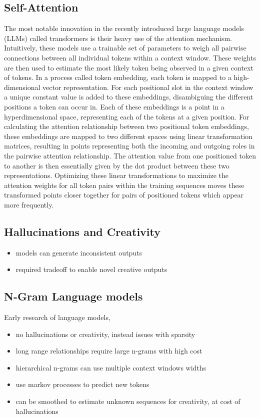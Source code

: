 \documentclass[10pt]{report}
\begin{document}
\subsection{Self-Attention}
The most notable innovation in the recently introduced large language models (LLMs) called transformers is their heavy use of the attention mechanism. Intuitively, these models use a trainable set of parameters to weigh all pairwise connections between all individual tokens within a context window. These weights are then used to estimate the most likely token being observed in a given context of tokens.
In a process called token embedding, each token is mapped to a high-dimensional vector representation. For each positional slot in the context window a unique constant value is added to these embeddings, disambiguing the different positions a token can occur in.
Each of these embeddings is a point in a hyperdimensional space, representing each of the tokens at a given position.
For calculating the attention relationship between two positional token embeddings, these embeddings are mapped to two different spaces using linear transformation matrices, resulting in points representing both the incoming and outgoing roles in the pairwise attention relationship. The attention value from one positioned token to another is then essentially given by the dot product between these two representations.
Optimizing these linear transformations to maximize the attention weights for all token pairs within the training sequences moves these transformed points closer together for pairs of positioned tokens which appear more frequently.

\subsection{Hallucinations and Creativity}
\begin{itemize}
    \item models can generate inconsistent outputs
    \item required tradeoff to enable novel creative outputs
\end{itemize}

\subsection{N-Gram Language models}
Early research of language models, 
\begin{itemize}
    \item no hallucinations or creativity, instead issues with sparsity
    \item long range relationships require large n-grams with high cost
    \item hierarchical n-grams can use multiple context windows widths
    \item use markov processes to predict new tokens
    \item can be smoothed to estimate unknown sequences for creativity, at cost of hallucinations
\end{itemize}
\end{document}
